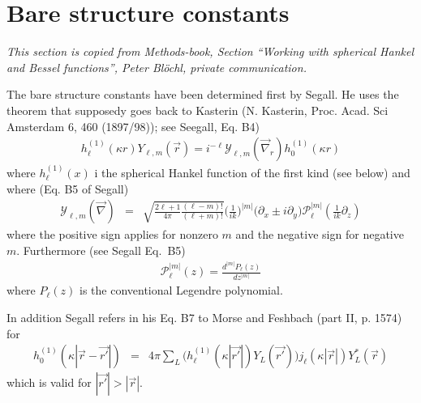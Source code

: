 \documentclass[11pt,a4paper]{report}
\begin{document}
\section{Bare structure constants}
\textit{ This section is copied from Methods-book, Section ``Working
  with spherical Hankel and Bessel functions'', Peter Bl\"ochl, private
  communication.}

The bare structure constants have been determined first by
Segall\cite{segall57_pr105_108}. He uses the
theorem\cite{korringa47_physica13_392} that supposedy goes back to
Kasterin (N. Kasterin, Proc. Acad. Sci Amsterdam 6, 460 (1897/98));
see Seegall\cite{segall57_pr105_108}, Eq. B4)
\begin{eqnarray}
h_\ell^{(1)}(\kappa r)Y_{\ell,m}(\vec{r})=i^{-\ell}
\mathcal{Y}_{\ell,m}(\vec{\nabla}_r)h_0^{(1)}(\kappa r)
\label{eq:hlfromh0}
\end{eqnarray}
where $h^{(1)}_\ell(x)$ i the spherical Hankel function of the first
kind (see  below)
and where (Eq. B5 of Segall\cite{segall57_pr105_108})
\begin{eqnarray}
\mathcal{Y}_{\ell,m}(\vec{\nabla})
&=&\sqrt{\frac{2\ell+1}{4\pi}\frac{(\ell-m)!}{(\ell+m)!}}
\biggl(\frac{1}{ik}\biggr)^{|m|}\biggl(\partial_x\pm i\partial_y\biggr)
\mathcal{P}_\ell^{|m|}\left(\frac{1}{ik}\partial_z\right)
\end{eqnarray}
where the positive sign applies for nonzero $m$ and the negative sign
for negative $m$. Furthermore (see Segall\cite{segall57_pr105_108}
Eq.~B5)
\begin{eqnarray*}
\mathcal{P}_\ell^{|m|}(z)=\frac{d^{|m|}P_\ell(z)}{dz^{|m|}}
\end{eqnarray*}
where $P_\ell(z)$ is the conventional Legendre polynomial.

In addition Segall\cite{segall57_pr105_108} refers in his Eq. B7 to
Morse and Feshbach\cite{morse53_book} (part II, p. 1574) for
\begin{eqnarray}
h_0^{(1)}(\kappa|\vec{r}-\vec{r'}|)&=&
4\pi\sum_L \biggl( h^{(1)}_\ell(\kappa|\vec{r'}|)Y_L(\vec{r'})\biggr)
j_\ell(\kappa|\vec{r}|)Y_L^*(\vec{r})
\label{eq:structureconstant0}
\end{eqnarray}
which is valid for $|\vec{r'}|>|\vec{r}|$.
\end{document}
